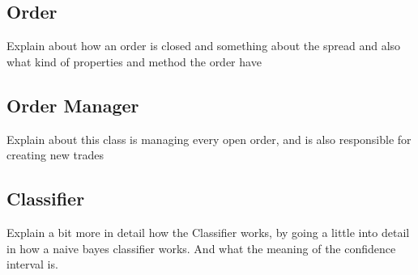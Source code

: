\subsection{Order}
Explain about how an order is closed and something about the spread and also what kind of properties and method the order have

\subsection{Order Manager}
Explain about this class is managing every open order, and is also responsible for creating new trades

\subsection{Classifier}
Explain a bit more in detail how the Classifier works, by going a little into detail in how a naive bayes classifier works. And what the meaning of the confidence interval is.